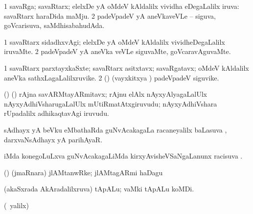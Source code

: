 \bentry
{} 
\gl{\gu}
\expl{}
\bmng
\bnum
\num{1} savaRga; savaRtarx; elelxDe yA oMdeV kAldalilx vividha eDegaLalilx iruva:  savaRtarx haraDida maMju. 
\num{2} padeVpadeV yA aneVkaveVLe -- siguva, goVcarisuva, saMdhisabahudAda. 
\enum
\emng
\eentry

\bentry
{} 
\gl{\kirxvi}
\expl{}
\bmng
\bnum
\num{1} savaRtarx sidadhxvAgi; elelxDe yA oMdeV kAldalilx vividheDegaLalilx iruvaMte. 
\num{2} padeVpadeV yA aneVka veVLe siguvaMte, goVcaravAguvaMte. 
\enum
\emng
\eentry

\bentry
{} 
\gl{\nA}
\expl{}
\bmng
{} 
\emng
\eentry

\bentry
{} 
\gl{\nA}
\expl{}
\bmng
\bnum
\num{1} savaRtarx parxtayxkaSxte; savaRtarx asitxtavx; savaRgatavx; oMdeV kAldalilx aneVka sathxLagaLalilxruvike. 
\num{2} (\hA) (vayxkitxya \vi) padeVpadeV siguvike. 
\enum
\emng

\noindent
\gl{\pagu}
\expl{}
\bmng
{} (\birx) (\nAyxshA) rAjna savARMtayARmitavx; rAjnu elAlx nAyxyAlyagaLalUlx nAyxyAdhiVsharugaLalUlx mUtiRmatAtxgiruvudu; nAyxyAdhiVshara rUpadalilx adhikaqtavAgi iruvudu. 
\emng
\eentry

\bentry
{}
\gl{\uparx}
\bmng
sAdhayx yA beVku eMbathaRda guNvAcakagaLa racaneyalilx baLasuva \uparx, \udA\  darxvaNsAdhayx yA parihAyaR. 
\emng
\eentry

\bentry
{} 
\gl{\uparx}
\expl{}
\bmng
{} iMda konegoLuLxva guNvAcakagaLiMda kirxyAvisheVSaNgaLanunx racisuva \uparx. 
\emng
\eentry

\bentry
{} 
\gl{\nA}
\bmng
 (\ca) (jmaRnara) jlAMtanwRke; jlAMtagARmi haDagu 
\emng
\eentry

\bentry
{} 
\gl{\nA}
\expl{}
\bmng
{} (akaSxrada AkAradalilxruva) tApALu; vaMki tApALu koMDi. 
\emng
\eentry

\bentry
{}
\gl{\saMkiSx}
\expl{}
\bmng
{} 
\emng
\eentry

\bentry
{}
\gl{\saMkiSx}
\expl{}
\bmng
{} 
\emng
\eentry

\bentry
{}
\gl{\saMkiSx}
\expl{}
\bmng
(\UK\ yalilx)  
\emng
\eentry

